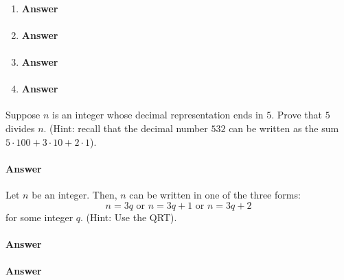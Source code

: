 \begin{enumerate}
    \item \todo{}
        \paragraph{Answer}
        \todo{}

    \item \todo{}
        \paragraph{Answer}
        \todo{}

    \item \todo{}
        \paragraph{Answer}
        \todo{}

    \item \todo{}
        \paragraph{Answer}
        \todo{}

\end{enumerate}

\collab{\todo{}}

Suppose $n$ is an integer whose decimal representation ends in $5$.  Prove that
$5$ divides $n$. (Hint: recall that the decimal number $532$ can be written as
the sum $5\cdot 100 + 3 \cdot 10 + 2 \cdot 1$).

\paragraph{Answer}
\todo{}

\collab{\todo{}}

Let $n$ be an integer.  Then, $n$ can be written in one of the three forms:
$$
    n=3q
    \text{ or }
    n=3q+1
    \text{ or }
    n=3q+2
$$
for some integer $q$. (Hint: Use the QRT).

\paragraph{Answer}
\todo{}

\collab{\todo{}}

\todo{}

\paragraph{Answer}
\todo{}

